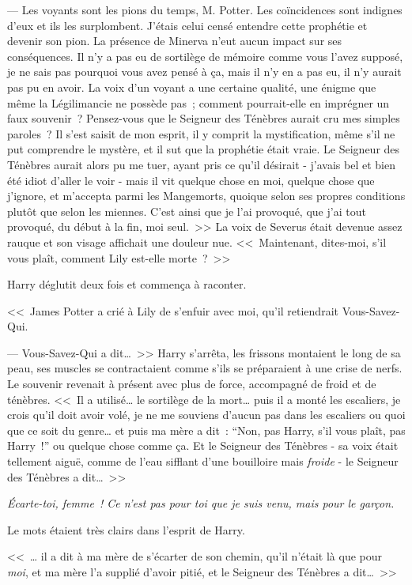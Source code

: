 --- Les voyants sont les pions du temps, M. Potter. Les coïncidences sont indignes d'eux et ils les surplombent. J'étais celui censé entendre cette prophétie et devenir son pion. La présence de Minerva n'eut aucun impact sur ses conséquences. Il n'y a pas eu de sortilège de mémoire comme vous l'avez supposé, je ne sais pas pourquoi vous avez pensé à ça, mais il n'y en a pas eu, il n'y aurait pas pu en avoir. La voix d'un voyant a une certaine qualité, une énigme que même la Légilimancie ne possède pas~; comment pourrait-elle en imprégner un faux souvenir~? Pensez-vous que le Seigneur des Ténèbres aurait cru mes simples paroles~? Il s'est saisit de mon esprit, il y comprit la mystification, même s'il ne put comprendre le mystère, et il sut que la prophétie était vraie. Le Seigneur des Ténèbres aurait alors pu me tuer, ayant pris ce qu'il désirait - j'avais bel et bien été idiot d'aller le voir - mais il vit quelque chose en moi, quelque chose que j'ignore, et m'accepta parmi les Mangemorts, quoique selon ses propres conditions plutôt que selon les miennes. C'est ainsi que je l'ai provoqué, que j'ai tout provoqué, du début à la fin, moi seul.~>> La voix de Severus était devenue assez rauque et son visage affichait une douleur nue. <<~Maintenant, dites-moi, s'il vous plaît, comment Lily est-elle morte~?~>>

Harry déglutit deux fois et commença à raconter.

<<~James Potter a crié à Lily de s'enfuir avec moi, qu'il retiendrait Vous-Savez-Qui.

--- Vous-Savez-Qui a dit…~>> Harry s'arrêta, les frissons montaient le long de sa peau, ses muscles se contractaient comme s'ils se préparaient à une crise de nerfs. Le souvenir revenait à présent avec plus de force, accompagné de froid et de ténèbres. <<~Il a utilisé… le sortilège de la mort… puis il a monté les escaliers, je crois qu'il doit avoir volé, je ne me souviens d'aucun pas dans les escaliers ou quoi que ce soit du genre… et puis ma mère a dit~: “Non, pas Harry, s'il vous plaît, pas Harry~!” ou quelque chose comme ça. Et le Seigneur des Ténèbres - sa voix était tellement aiguë, comme de l'eau sifflant d'une bouilloire mais \emph{froide} - le Seigneur des Ténèbres a dit…~>>

\emph{Écarte-toi, femme~! Ce n'est pas pour toi que je suis venu, mais pour le garçon.}

Le mots étaient très clairs dans l'esprit de Harry.

<<~… il a dit à ma mère de s'écarter de son chemin, qu'il n'était là que pour \emph{moi}, et ma mère l'a supplié d'avoir pitié, et le Seigneur des Ténèbres a dit…~>>

